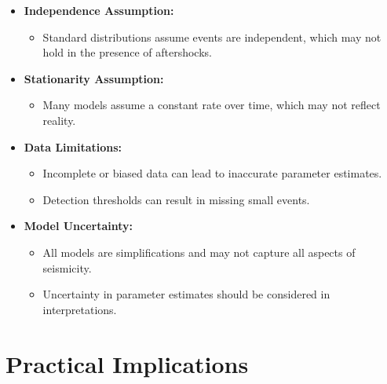 \documentclass{article}
\begin{document}
\begin{itemize}
    \item \textbf{Independence Assumption:}

    \begin{itemize}
        \item Standard distributions assume events are independent, which may not hold in the presence of aftershocks.
    \end{itemize}

    \item \textbf{Stationarity Assumption:}

    \begin{itemize}
        \item Many models assume a constant rate over time, which may not reflect reality.
    \end{itemize}

    \item \textbf{Data Limitations:}

    \begin{itemize}
        \item Incomplete or biased data can lead to inaccurate parameter estimates.
        \item Detection thresholds can result in missing small events.
    \end{itemize}

    \item \textbf{Model Uncertainty:}

    \begin{itemize}
        \item All models are simplifications and may not capture all aspects of seismicity.
        \item Uncertainty in parameter estimates should be considered in interpretations.
    \end{itemize}
\end{itemize}

\section{Practical Implications}
\end{document}

